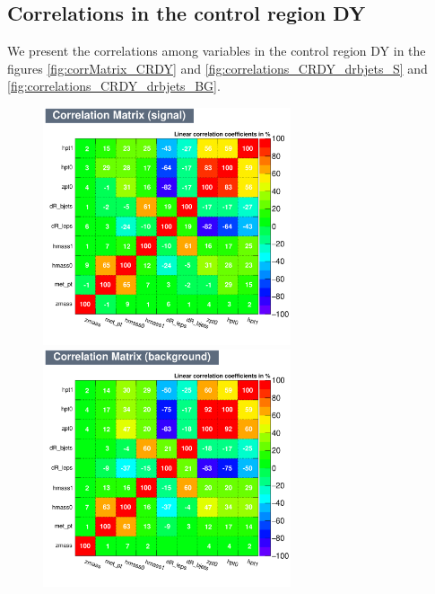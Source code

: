 \subsection{Correlations in the control region DY}
We present the correlations among variables in the control region DY in the figures \ref{fig:corrMatrix_CRDY} and
\ref{fig:correlations_CRDY_drbjets_S} and \ref{fig:correlations_CRDY_drbjets_BG}.

\begin{figure}[!htb]%
\centering

\includegraphics[width=0.65\textwidth]{figures/CRDY/dataset/plots/CorrelationMatrixS.pdf}
\bigbreak
\includegraphics[width=0.65\textwidth]{figures/CRDY/dataset/plots/CorrelationMatrixB.pdf}

\end{figure}
